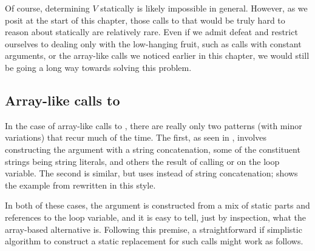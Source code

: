 Of course, determining $V$ statically is likely impossible in general. However,
as we posit at the start of this chapter, those calls to  that would
be truly hard to reason about statically are relatively rare. Even if we admit
defeat and restrict ourselves to dealing only with the low-hanging fruit, such
as calls with constant arguments, or the array-like calls we noticed earlier in
this chapter, we would still be going a long way towards solving this problem.

\subsection{Array-like calls to }

In the case of array-like calls to , there are really only two
patterns (with minor variations) that recur much of the time. The first, as
seen in , involves constructing the argument with a
string concatenation, some of the constituent strings being string
literals, and others the result of calling  or  on
the loop variable. The second is similar, but uses  instead of
string concatenation;  shows the example from
 rewritten in this style.



In both of these cases, the argument is constructed from a mix of static parts
and references to the loop variable, and it is easy to tell, just by
inspection, what the array-based alternative is. Following this premise, a
straightforward if simplistic algorithm to construct a static replacement
for such calls might work as follows.

